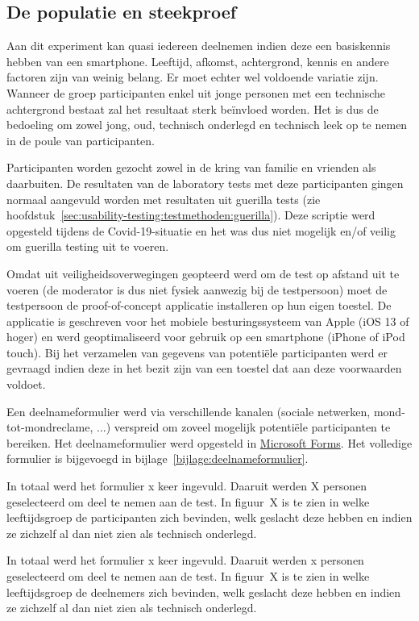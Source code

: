 \subsection{De populatie en steekproef}
\label{sec:experiment:populatie-steekproef}

Aan dit experiment kan quasi iedereen deelnemen indien deze een basiskennis hebben van een smartphone. Leeftijd, afkomst, achtergrond, kennis en andere factoren zijn van weinig belang. Er moet echter wel voldoende variatie zijn. Wanneer de groep participanten enkel uit jonge personen met een technische achtergrond bestaat zal het resultaat sterk beïnvloed worden. Het is dus de bedoeling om zowel jong, oud, technisch onderlegd en technisch leek op te nemen in de poule van participanten.

Participanten worden gezocht zowel in de kring van familie en vrienden als daarbuiten. De resultaten van de laboratory tests met deze participanten gingen normaal aangevuld worden met resultaten uit guerilla tests (zie hoofdstuk~\ref{sec:usability-testing:testmethoden:guerilla}). Deze scriptie werd opgesteld tijdens de Covid-19-situatie en het was dus niet mogelijk en/of veilig om guerilla testing uit te voeren.

Omdat uit veiligheidsoverwegingen geopteerd werd om de test op afstand uit te voeren (de moderator is dus niet fysiek aanwezig bij de testpersoon) moet de testpersoon de proof-of-concept applicatie installeren op hun eigen toestel. De applicatie is geschreven voor het mobiele besturingssysteem van Apple (iOS 13 of hoger) en werd geoptimaliseerd voor gebruik op een smartphone (iPhone of iPod touch). Bij het verzamelen van gegevens van potentiële participanten werd er gevraagd indien deze in het bezit zijn van een toestel dat aan deze voorwaarden voldoet.

Een deelnameformulier werd via verschillende kanalen (sociale netwerken, mond-tot-mondreclame, ...) verspreid om zoveel mogelijk potentiële participanten te bereiken. Het deelnameformulier werd opgesteld in \href{https://forms.office.com/}{Microsoft Forms}. Het volledige formulier is bijgevoegd in bijlage~\ref{bijlage:deelnameformulier}.

In totaal werd het formulier x keer ingevuld. Daaruit werden X personen geselecteerd om deel te nemen aan de test. In figuur~X is te zien in welke leeftijdsgroep de participanten zich bevinden, welk geslacht deze hebben en indien ze zichzelf al dan niet zien als technisch onderlegd.


In totaal werd het formulier x keer ingevuld. Daaruit werden x personen geselecteerd om deel te nemen aan de test. In figuur~X is te zien in welke leeftijdsgroep de deelnemers zich bevinden, welk geslacht deze hebben en indien ze zichzelf al dan niet zien als technisch onderlegd.
